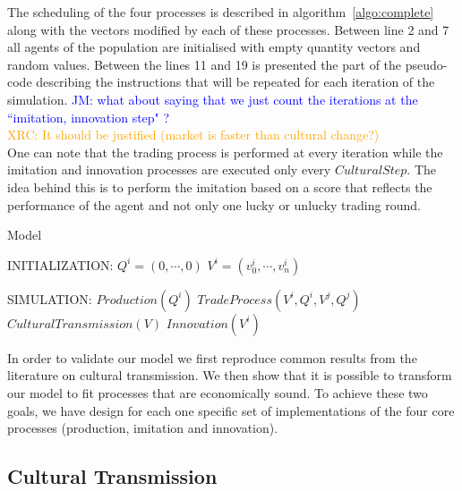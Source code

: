 \documentclass{wscpaperproc}
\newcommand{\memo}[2]{\textcolor{#1}{#2}}
\newcommand{\jm}[1]{\memo{blue}{JM: #1\\}}
\newcommand{\xrc}[1]{\memo{orange}{XRC: #1\\}}
\begin{document}
The scheduling of the four processes is described in algorithm~\ref{algo:complete} along with the vectors modified by each of these processes. Between line 2 and 7 all agents of the population are initialised with empty quantity vectors and random values. Between the lines 11 and 19 is presented the part of the pseudo-code describing the instructions that will be repeated for each iteration of the simulation. 
\jm{what about saying that we just count the iterations at the ``imitation, innovation step" ?}
\xrc{It should be justified (market is faster than cultural change?)}
One can note that the trading process is performed at every iteration while the imitation and innovation processes are executed only every $CulturalStep$. The idea behind this is to perform the imitation based on a score that reflects the performance of the agent and not only one lucky or unlucky trading round. 

\begin{algorithm}
\caption{Model}
\label{algo:complete}
	\begin{algorithmic}[1]
	\scriptsize
	\State INITIALIZATION: 
			 
				\State $Q^i = (0, \cdots, 0)$
				\State $V^i = (v^i_0, \cdots, v^i_n)$ 
			\EndFor
		\EndFor

	\State SIMULATION:
				\State $Production(Q^i)$
					\State $TradeProcess(V^i,Q^i,V^j,Q^j)$
				\EndFor				
					\State $CulturalTransmission(V)$
					\State $Innovation(V^i)$
				\EndIf
			\EndFor
		\EndLoop
\end{algorithmic}
\end{algorithm}


In order to validate our model we first reproduce common results from the literature on cultural transmission. We then show that it is possible to transform our model to fit processes that are economically sound. To achieve these two goals, we have design for each one specific set of implementations of the four core processes (production, imitation and innovation). 

\subsection{Cultural Transmission}\label{sec:culturalTrans}
\end{document}
